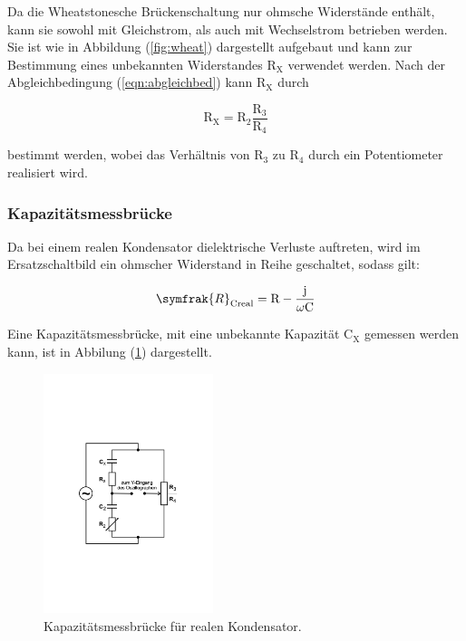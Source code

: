 \noindent
Da die Wheatstonesche Brückenschaltung nur ohmsche Widerstände enthält, kann sie sowohl mit Gleichstrom, 
als auch mit Wechselstrom betrieben werden.
Sie ist wie in Abbildung (\ref{fig:wheat}) dargestellt aufgebaut und kann zur Bestimmung eines unbekannten Widerstandes $\text{R}_\text{X}$ verwendet werden.
Nach der Abgleichbedingung (\ref{eqn:abgleichbed}) kann $\text{R}_\text{X}$ durch

\begin{equation}
\text{R}_\text{X} = \text{R}_2 \frac{\text{R}_3}{\text{R}_4}
\end{equation}

\noindent
bestimmt werden, wobei das Verhältnis von $\text{R}_3$ zu $\text{R}_4$ durch ein Potentiometer realisiert wird.

\subsubsection{Kapazitätsmessbrücke}
Da bei einem realen Kondensator dielektrische Verluste auftreten, wird im Ersatzschaltbild ein ohmscher Widerstand in Reihe geschaltet, sodass gilt:

\begin{equation}
\symfrak{R}_\text{Creal}= \text{R}-\frac{\text{j}}{\omega \text{C}}
\label{eqn:r_creal}
\end{equation}

\noindent
Eine Kapazitätsmessbrücke, mit eine unbekannte Kapazität $\text{C}_\text{X}$ gemessen werden kann, ist in Abbilung (\ref{fig:kap}) dargestellt.

\newpage
\begin{figure}
            \centering
               \includegraphics[height=7cm]{Bilder/kapazitaet.pdf}
               \caption{Kapazitätsmessbrücke für realen Kondensator.}
               \label{fig:kap}
        \end{figure}

